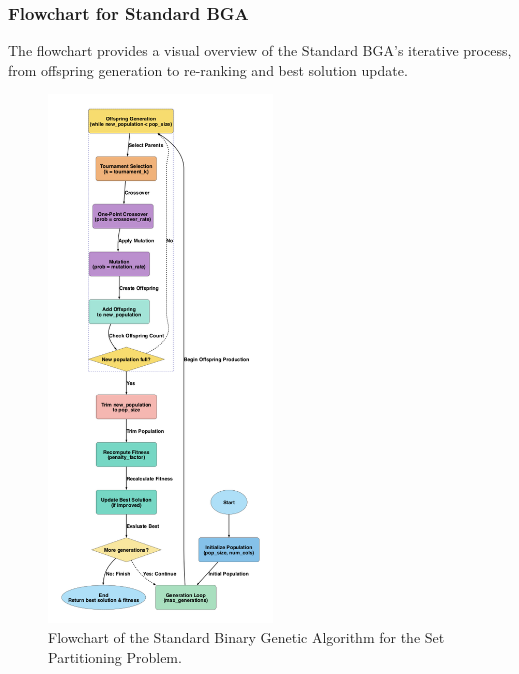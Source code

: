 \documentclass[12pt]{article}
\begin{document}
\subsubsection{Flowchart for Standard BGA}
The flowchart provides a visual overview of the Standard BGA’s iterative process, from offspring generation to re-ranking and best solution update.

\begin{figure}[htbp]
  \centering
  \includegraphics[width=0.53\textwidth]{images/standard_bga_flowchart.png}
  \caption{Flowchart of the Standard Binary Genetic Algorithm for the Set Partitioning Problem.}
  \label{fig:flowchart2}
\end{figure}

\newpage
\end{document}
